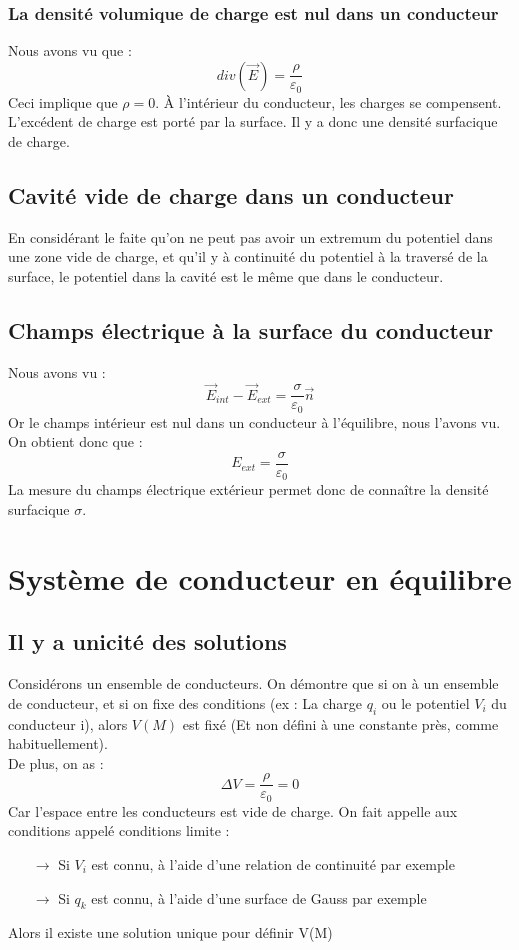 \subsubsection{La densité volumique de charge est nul dans un conducteur}
Nous avons vu que : 
$$div(\overrightarrow{E}) = \dfrac{\rho}{\varepsilon_0}$$
Ceci implique que $\rho=0$. À l'intérieur du conducteur, les charges se compensent. L'excédent de charge est porté par la surface. Il y a donc une densité surfacique de charge.
\subsection{Cavité vide de charge dans un conducteur}
En considérant le faite qu'on ne peut pas avoir un extremum du potentiel dans une zone vide de charge, et qu'il y à continuité du potentiel à la traversé de la surface, le potentiel dans la cavité est le même que dans le conducteur.
\subsection{Champs électrique à la surface du conducteur}
Nous avons vu : 
$$\overrightarrow{E}_{int}-\overrightarrow{E}_{ext} = \dfrac{\sigma}{\varepsilon_0}\overrightarrow{n}$$
Or le champs intérieur est nul dans un conducteur à l'équilibre, nous l'avons vu. On obtient donc que : 
$$E_{ext} = \dfrac{\sigma}{\varepsilon_0}$$
La mesure du champs électrique extérieur permet donc de connaître la densité surfacique $\sigma$.
\section{Système de conducteur en équilibre}
\subsection{Il y a unicité des solutions}
Considérons un ensemble de conducteurs. On démontre que si on à un ensemble de conducteur, et si on fixe des conditions (ex : La charge $q_i$ ou le potentiel $V_i$ du conducteur i), alors $V(M)$ est fixé (Et non défini à une constante près, comme habituellement).\\
De plus, on as : 
$$\Delta V = \dfrac{\rho}{\varepsilon_0} = 0$$
Car l'espace entre les conducteurs est vide de charge. On fait appelle aux conditions appelé conditions limite : 
\begin{itemize}
 \item[$\rightarrow$] Si $V_i$ est connu, à l'aide d'une relation de continuité par exemple
 \item[$\rightarrow$] Si $q_k$ est connu, à l'aide d'une surface de Gauss par exemple
\end{itemize}
Alors il existe une solution unique pour définir V(M)
